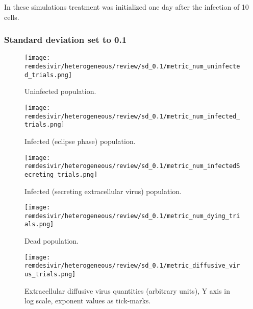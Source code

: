 In these simulations treatment was initialized one day after the infection of 10 cells.

\subsubsection{Standard deviation set to 0.1}

\begin{figure}[H]
\texttt{[image: remdesivir/heterogeneous/review/sd\_0.1/metric\_num\_uninfected\_trials.png]}
\caption{Uninfected population.\label{fig:app:hetero_other_sd:0.1:uninf}}
\end{figure}

\begin{figure}[H]
\texttt{[image: remdesivir/heterogeneous/review/sd\_0.1/metric\_num\_infected\_trials.png]}
\caption{Infected (eclipse phase) population.\label{fig:app:hetero_other_sd:0.1:inf}}
\end{figure}

\begin{figure}[H]
\texttt{[image: remdesivir/heterogeneous/review/sd\_0.1/metric\_num\_infectedSecreting\_trials.png]}
\caption{Infected (secreting extracellular virus) population.\label{fig:app:hetero_other_sd:0.1:infSecr}}
\end{figure}

\begin{figure}[H]
\texttt{[image: remdesivir/heterogeneous/review/sd\_0.1/metric\_num\_dying\_trials.png]}
\caption{Dead population.\label{fig:app:hetero_other_sd:0.1:dead}}
\end{figure}

\begin{figure}[H]
\texttt{[image: remdesivir/heterogeneous/review/sd\_0.1/metric\_diffusive\_virus\_trials.png]}
\caption{Extracellular diffusive virus quantities (arbitrary units), Y axis in log scale, exponent values as tick-marks.\label{fig:app:hetero_other_sd:0.1:diff_vir}}
\end{figure}


